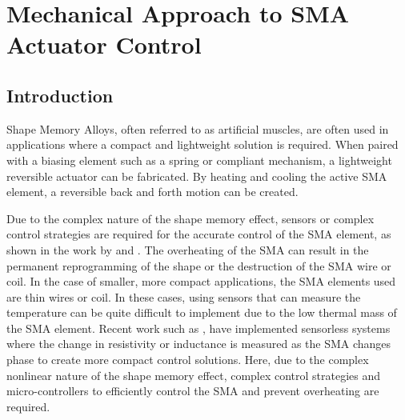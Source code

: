 
\chapter{Mechanical Approach to SMA Actuator Control}\label{chap:integrated-control}


\section{Introduction}
Shape Memory Alloys, often referred to as artificial muscles, are often used in applications where a compact and lightweight solution is required. When paired with a biasing element such as a spring or compliant mechanism, a lightweight reversible actuator can be fabricated. By heating and cooling the active SMA element, a reversible back and forth motion can be created.

Due to the complex nature of the shape memory effect, sensors or complex control strategies are required for the accurate control of the SMA element, as shown in the work by \cite{narayanan_control_2016} and \cite{mansour_anfis-based_2020}. The overheating of the SMA can result in the permanent reprogramming of the shape or the destruction of the SMA wire or coil. In the case of smaller, more compact applications, the SMA elements used are thin wires or coil. In these cases, using sensors that can measure the temperature can be quite difficult to implement due to the low thermal mass of the SMA element. Recent work such as \cite{sakagami_sensorless_2019}, have implemented sensorless systems where the change in resistivity or inductance is measured as the SMA changes phase to create more compact control solutions. Here, due to the complex nonlinear nature of the shape memory effect, complex control strategies and micro-controllers to efficiently control the SMA and prevent overheating are required.

